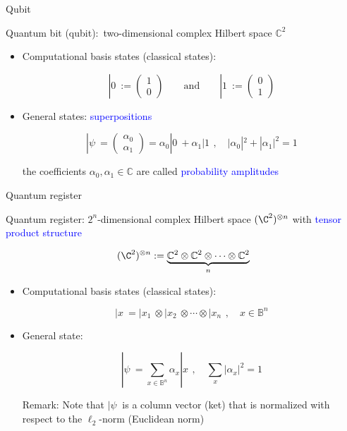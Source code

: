 \begin{frame}{Qubit}

Quantum bit (qubit):\, two-dimensional complex Hilbert space $\mathbb{C}^2$\,

\bigskip
\begin{itemize}
\item Computational basis states (classical states):

\bigskip
\[
|0\>:=\left(\begin{array}{c}1\\0\end{array}\right)
\quad\quad\mbox{and}\quad\quad
|1\>:=\left(\begin{array}{c}0\\1\end{array}\right)
\]

\bigskip
\item General states: \textcolor{blue}{superpositions}

\bigskip
\[
|\psi\> = 
\left(
\begin{array}{c}
\alpha_0 \\
\alpha_1
\end{array}
\right)=
\alpha_0 |0\> + \alpha_1 |1\>\,,\quad |\alpha_0|^2+|\alpha_1|^2=1
\]

\bigskip
the coefficients $\alpha_0,\alpha_1\in\mathbb{C}$ are called \textcolor{blue}{probability amplitudes}
\end{itemize}

\end{frame}




\begin{frame}{Quantum register}

Quantum register: $2^n$-dimensional complex Hilbert space $(\C^2)^{\otimes n}$ with \textcolor{blue}{tensor product structure}

\[
(\C^2)^{\otimes n} := \underbrace{\mathbb{C}^2\otimes\mathbb{C}^2\otimes\cdots\otimes\mathbb{C}^2}_{n}
\]

\medskip
\begin{itemize}
\item Computational basis states (classical states):

\medskip
\[
|x\> = |x_1\> \otimes |x_2\> \otimes \cdots \otimes |x_n\>\,,\quad x\in\mathbb{B}^n
\]

\medskip
\item General state:

\medskip
\[
|\psi\>=\sum_{x\in\mathbb{B}^n} \alpha_x |x\>\,,\quad \sum_{x} |\alpha_x|^2 = 1
\]

\bigskip

\bigskip
Remark: Note that $|\psi\>$ is a column vector (ket) that is normalized with respect to the $\ell_2$-norm (Euclidean norm)
\end{itemize}
\end{frame}

